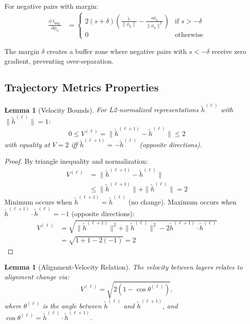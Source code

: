 \documentclass[11pt]{article}
\newtheorem{lemma}[theorem]{Lemma}
\begin{document}
For negative pairs with margin:
\begin{align}
\frac{\partial \ell_{\text{neg}}}{\partial \phi_h} &= \begin{cases}
2(s + \delta) \left( \frac{\tilde{e}}{\|\phi_h\|} - \frac{s \phi_h}{\|\phi_h\|^2} \right) & \text{if } s > -\delta \\
0 & \text{otherwise}
\end{cases}
\end{align}

The margin $\delta$ creates a buffer zone where negative pairs with $s < -\delta$ receive zero gradient, preventing over-separation.

\subsection{Trajectory Metrics Properties}

\begin{lemma}[Velocity Bounds]
For L2-normalized representations $\tilde{h}^{(\ell)}$ with $\|\tilde{h}^{(\ell)}\| = 1$:
\[
0 \leq V^{(\ell)} = \|\tilde{h}^{(\ell+1)} - \tilde{h}^{(\ell)}\| \leq 2
\]
with equality at $V = 2$ iff $\tilde{h}^{(\ell+1)} = -\tilde{h}^{(\ell)}$ (opposite directions).
\end{lemma}

\begin{proof}
By triangle inequality and normalization:
\begin{align}
V^{(\ell)} &= \|\tilde{h}^{(\ell+1)} - \tilde{h}^{(\ell)}\| \\
&\leq \|\tilde{h}^{(\ell+1)}\| + \|\tilde{h}^{(\ell)}\| = 2
\end{align}
Minimum occurs when $\tilde{h}^{(\ell+1)} = \tilde{h}^{(\ell)}$ (no change).
Maximum occurs when $\tilde{h}^{(\ell+1)} \cdot \tilde{h}^{(\ell)} = -1$ (opposite directions):
\begin{align}
V^{(\ell)} &= \sqrt{\|\tilde{h}^{(\ell+1)}\|^2 + \|\tilde{h}^{(\ell)}\|^2 - 2\tilde{h}^{(\ell+1)} \cdot \tilde{h}^{(\ell)}} \\
&= \sqrt{1 + 1 - 2(-1)} = 2
\end{align}
\end{proof}

\begin{lemma}[Alignment-Velocity Relation]
The velocity between layers relates to alignment change via:
\[
V^{(\ell)} = \sqrt{2(1 - \cos\theta^{(\ell)})},
\]
where $\theta^{(\ell)}$ is the angle between $\tilde{h}^{(\ell)}$ and $\tilde{h}^{(\ell+1)}$, and $\cos\theta^{(\ell)} = \tilde{h}^{(\ell)} \cdot \tilde{h}^{(\ell+1)}$.
\end{lemma}
\end{document}
